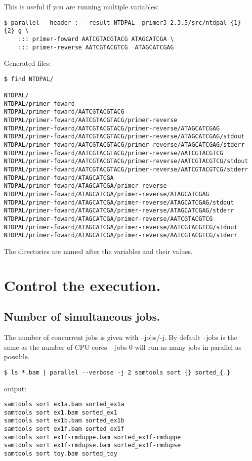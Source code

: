 \documentclass{article}
\begin{document}
This is useful if you are running multiple variables:
\begin{lstlisting}
$ parallel --header : --result NTDPAL  primer3-2.3.5/src/ntdpal {1} {2} g \
	::: primer-foward AATCGTACGTACG ATAGCATCGA \
	::: primer-reverse AATCGTACGTCG  ATAGCATCGAG
\end{lstlisting}
Generated files:
\begin{lstlisting}
$ find NTDPAL/

NTDPAL/
NTDPAL/primer-foward
NTDPAL/primer-foward/AATCGTACGTACG
NTDPAL/primer-foward/AATCGTACGTACG/primer-reverse
NTDPAL/primer-foward/AATCGTACGTACG/primer-reverse/ATAGCATCGAG
NTDPAL/primer-foward/AATCGTACGTACG/primer-reverse/ATAGCATCGAG/stdout
NTDPAL/primer-foward/AATCGTACGTACG/primer-reverse/ATAGCATCGAG/stderr
NTDPAL/primer-foward/AATCGTACGTACG/primer-reverse/AATCGTACGTCG
NTDPAL/primer-foward/AATCGTACGTACG/primer-reverse/AATCGTACGTCG/stdout
NTDPAL/primer-foward/AATCGTACGTACG/primer-reverse/AATCGTACGTCG/stderr
NTDPAL/primer-foward/ATAGCATCGA
NTDPAL/primer-foward/ATAGCATCGA/primer-reverse
NTDPAL/primer-foward/ATAGCATCGA/primer-reverse/ATAGCATCGAG
NTDPAL/primer-foward/ATAGCATCGA/primer-reverse/ATAGCATCGAG/stdout
NTDPAL/primer-foward/ATAGCATCGA/primer-reverse/ATAGCATCGAG/stderr
NTDPAL/primer-foward/ATAGCATCGA/primer-reverse/AATCGTACGTCG
NTDPAL/primer-foward/ATAGCATCGA/primer-reverse/AATCGTACGTCG/stdout
NTDPAL/primer-foward/ATAGCATCGA/primer-reverse/AATCGTACGTCG/stderr
\end{lstlisting}
The directories are named after the variables and their values.
\section{Control the execution.}
\subsection{Number of simultaneous jobs.}
The number of concurrent jobs is given with --jobs/-j. By default --jobs is the same as the number of CPU cores. --jobs 0 will run as many jobs in parallel as possible.
\begin{lstlisting}
$ ls *.bam | parallel --verbose -j 2 samtools sort {} sorted_{.}
\end{lstlisting}
output:
\begin{lstlisting}
samtools sort ex1a.bam sorted_ex1a
samtools sort ex1.bam sorted_ex1
samtools sort ex1b.bam sorted_ex1b
samtools sort ex1f.bam sorted_ex1f
samtools sort ex1f-rmduppe.bam sorted_ex1f-rmduppe
samtools sort ex1f-rmdupse.bam sorted_ex1f-rmdupse
samtools sort toy.bam sorted_toy
\end{lstlisting}
\end{document}
